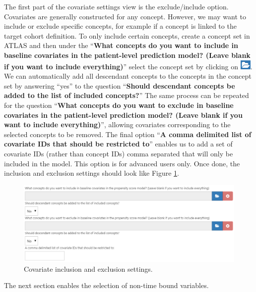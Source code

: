 \documentclass[11pt]{book}
\theoremstyle{definition}
\theoremstyle{definition}
\theoremstyle{definition}
\theoremstyle{remark}
\begin{document}
The first part of the covariate settings view is the exclude/include option. Covariates are generally constructed for any concept. However, we may want to include or exclude specific concepts, for example if a concept is linked to the target cohort definition. To only include certain concepts, create a concept set in ATLAS and then under the ``\textbf{What concepts do you want to include in baseline covariates in the patient-level prediction model? (Leave blank if you want to include everything)}'' select the concept set by clicking on \includegraphics{images/PopulationLevelEstimation/open.png}. We can automatically add all descendant concepts to the concepts in the concept set by answering ``yes'' to the question ``\textbf{Should descendant concepts be added to the list of included concepts?}'' The same process can be repeated for the question ``\textbf{What concepts do you want to exclude in baseline covariates in the patient-level prediction model? (Leave blank if you want to include everything)}'', allowing covariates corresponding to the selected concepts to be removed. The final option ``\textbf{A comma delimited list of covariate IDs that should be restricted to}'' enables us to add a set of covariate IDs (rather than concept IDs) comma separated that will only be included in the model. This option is for advanced users only. Once done, the inclusion and exclusion settings should look like Figure \ref{fig:covariateSettings1}.

\begin{figure}

{\centering \includegraphics[width=1\linewidth]{images/PatientLevelPrediction/covariateSettings1} 

}

\caption{Covariate inclusion and exclusion settings.}\label{fig:covariateSettings1}
\end{figure}

The next section enables the selection of non-time bound variables.
\end{document}
